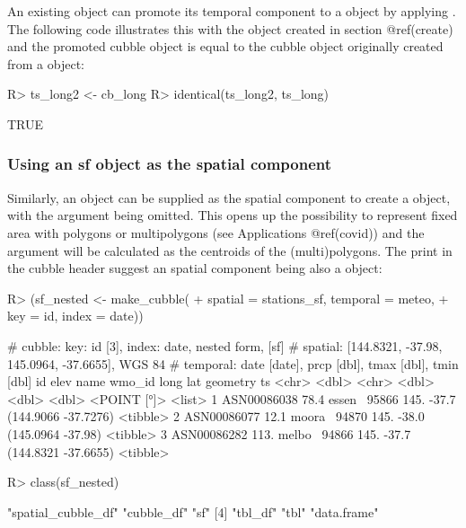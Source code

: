 \documentclass[
]{jss}
\begin{document}
An existing  object can promote its temporal component to a
 object by applying . The
following code illustrates this with the object  created
in section @ref(create) and the promoted cubble object is equal to the
cubble object originally created from a  object:

\begin{CodeChunk}
\begin{CodeInput}
R> ts_long2 <- cb_long %
R> identical(ts_long2, ts_long)
\end{CodeInput}
\begin{CodeOutput}
[1] TRUE
\end{CodeOutput}
\end{CodeChunk}

\hypertarget{using-an-sf-object-as-the-spatial-component}{%
\subsubsection{Using an sf object as the spatial
component}\label{using-an-sf-object-as-the-spatial-component}}

Similarly, an  object can be supplied as the spatial component
to create a  object, with the  argument being
omitted. This opens up the possibility to represent fixed area with
polygons or multipolygons (see Applications @ref(covid)) and the
 argument will be calculated as the centroids of the
(multi)polygons. The \code{[sf]} print in the cubble header suggest an
spatial component being also a  object:

\begin{CodeChunk}
\begin{CodeInput}
R> (sf_nested <- make_cubble(
+   spatial = stations_sf, temporal = meteo, 
+   key = id, index = date))
\end{CodeInput}
\begin{CodeOutput}
# cubble:   key: id [3], index: date, nested form, [sf]
# spatial:  [144.8321, -37.98, 145.0964, -37.6655], WGS 84
# temporal: date [date], prcp [dbl], tmax [dbl], tmin [dbl]
  id           elev name   wmo_id  long   lat            geometry ts      
  <chr>       <dbl> <chr>   <dbl> <dbl> <dbl>         <POINT [°]> <list>  
1 ASN00086038  78.4 essen~  95866  145. -37.7 (144.9066 -37.7276) <tibble>
2 ASN00086077  12.1 moora~  94870  145. -38.0   (145.0964 -37.98) <tibble>
3 ASN00086282 113.  melbo~  94866  145. -37.7 (144.8321 -37.6655) <tibble>
\end{CodeOutput}
\begin{CodeInput}
R> class(sf_nested)
\end{CodeInput}
\begin{CodeOutput}
[1] "spatial_cubble_df" "cubble_df"         "sf"               
[4] "tbl_df"            "tbl"               "data.frame"       
\end{CodeOutput}
\end{CodeChunk}
\end{document}
